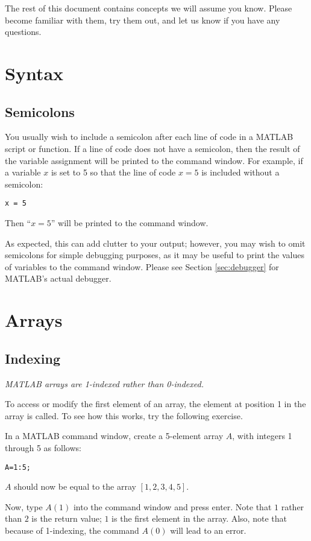 \documentclass{article}
\begin{document}
The rest of this document contains concepts we will assume you know. Please become familiar with them, try them out, and let us know if you have any questions.

\section{Syntax}
\subsection{Semicolons}
You usually wish to include a semicolon after each line of code in a MATLAB script or function. If a line of code does not have a semicolon, then the result of the variable assignment will be printed to the command window. For example, if a variable $x$ is set to 5 so that the line of code $x=5$ is included without a semicolon:
\begin{lstlisting}[style=Matlab-editor]
x = 5
\end{lstlisting}
Then ``$x=5$'' will be printed to the command window.

As expected, this can add clutter to your output; however, you may wish to omit semicolons for simple debugging purposes, as it may be useful to print the values of variables to the command window. Please see Section \ref{sec:debugger} for MATLAB's actual debugger.


\section{Arrays}

\subsection{Indexing}

\emph{MATLAB arrays are 1-indexed rather than 0-indexed.} 

To access or modify the first element of an array, the element at position 1 in the array is called. To see how this works, try the following exercise.

In a MATLAB command window, create a 5-element array $A$, with integers 1 through 5 as follows: \begin{lstlisting}[style=Matlab-editor]
A=1:5;
\end{lstlisting}

$A$ should now be equal to the array $[1,2,3,4,5]$.

Now, type $A(1)$ into the command window and press enter. Note that $1$ rather than $2$ is the return value; $1$ is the first element in the array. Also, note that because of 1-indexing, the command $A(0)$ will lead to an error.
\end{document}
